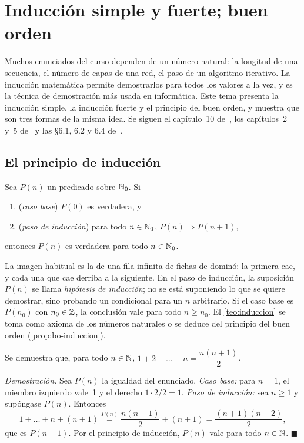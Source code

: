 \chapter{Inducción simple y fuerte; buen orden}
\label{tema:5}

Muchos enunciados del curso dependen de un número natural: la longitud de una secuencia, el número de capas de una red, el paso de un algoritmo iterativo. La inducción matemática permite demostrarlos para todos los valores a la vez, y es la técnica de demostración más usada en informática. Este tema presenta la inducción simple, la inducción fuerte y el principio del buen orden, y muestra que son tres formas de la misma idea. Se siguen el capítulo~10 de~\cite{hammack}, los capítulos~2 y~5 de~\cite{mcs} y las §6.1, 6.2 y 6.4 de~\cite{velleman}.

\section{El principio de inducción}

\begin{teorema}\label{teo:induccion}
Sea $P(n)$ un predicado sobre $\mathbb{N}_0$. Si
\begin{enumerate}
  \item (\emph{caso base}) $P(0)$ es verdadera, y
  \item (\emph{paso de inducción}) para todo $n\in\mathbb{N}_0$, $P(n)\Rightarrow P(n+1)$,
\end{enumerate}
entonces $P(n)$ es verdadera para todo $n\in\mathbb{N}_0$.
\end{teorema}

La imagen habitual es la de una fila infinita de fichas de dominó: la primera cae, y cada una que cae derriba a la siguiente. En el paso de inducción, la suposición $P(n)$ se llama \emph{hipótesis de inducción}; no se está suponiendo lo que se quiere demostrar, sino probando un condicional para un $n$ arbitrario. Si el caso base es $P(n_0)$ con $n_0\in\mathbb{Z}$, la conclusión vale para todo $n\ge n_0$. El \cref{teo:induccion} se toma como axioma de los números naturales o se deduce del principio del buen orden (\cref{prop:bo-induccion}).

\begin{ejemplo}\label{ej:gauss}
Se demuestra que, para todo $n\in\mathbb{N}$, $1+2+\dots+n=\dfrac{n(n+1)}{2}$.

\emph{Demostración.} Sea $P(n)$ la igualdad del enunciado. \emph{Caso base:} para $n=1$, el miembro izquierdo vale~1 y el derecho $1\cdot 2/2=1$. \emph{Paso de inducción:} sea $n\ge 1$ y supóngase $P(n)$. Entonces
\[
1+\dots+n+(n+1)\overset{P(n)}{=}\frac{n(n+1)}{2}+(n+1)=\frac{(n+1)(n+2)}{2},
\]
que es $P(n+1)$. Por el principio de inducción, $P(n)$ vale para todo $n\in\mathbb{N}$. \hfill$\blacksquare$
\end{ejemplo}

